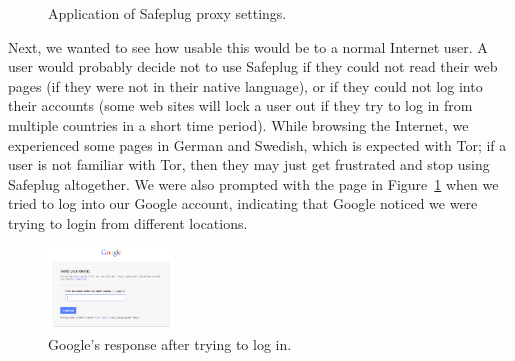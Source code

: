 \documentclass[conference]{IEEEtran}
\begin{document}
\begin{figure}[!b]
\centering
{}
\quad
{}
\caption{Application of Safeplug proxy settings.}
\end{figure}

Next, we wanted to see how usable this would be to a normal Internet user.  A user would probably decide not to use Safeplug if they could not read their web pages (if they were not in their native language), or if they could not log into their accounts (some web sites will lock a user out if they try to log in from multiple countries in a short time period).  While browsing the Internet, we experienced some pages in German and Swedish, which is expected with Tor; if a user is not familiar with Tor, then they may just get frustrated and stop using Safeplug altogether.  We were also prompted with the page in Figure~\ref{fig:funnygoogle} when we tried to log into our Google account, indicating that Google noticed we were trying to login from different locations.

\begin{figure}
  \begin{center}
  \includegraphics[width=0.3\textwidth]{funnygoogle}
  \caption{Google's response after trying to log in.}
  \label{fig:funnygoogle}
	\end{center}
\end{figure}
\end{document}
